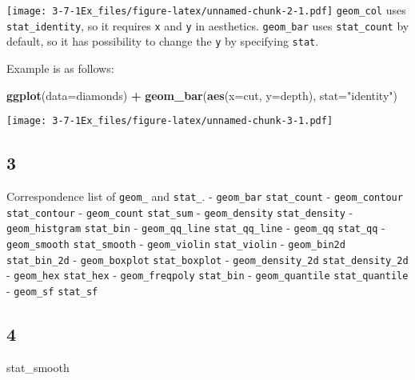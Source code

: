 \documentclass[]{article}
\newenvironment{Shaded}{\begin{snugshade}}{\end{snugshade}}
\newcommand{\DataTypeTok}[1]{\textcolor[rgb]{0.13,0.29,0.53}{#1}}
\newcommand{\KeywordTok}[1]{\textcolor[rgb]{0.13,0.29,0.53}{\textbf{#1}}}
\newcommand{\NormalTok}[1]{#1}
\newcommand{\OperatorTok}[1]{\textcolor[rgb]{0.81,0.36,0.00}{\textbf{#1}}}
\newcommand{\StringTok}[1]{\textcolor[rgb]{0.31,0.60,0.02}{#1}}
\begin{document}
\texttt{[image: 3-7-1Ex\_files/figure-latex/unnamed-chunk-2-1.pdf]}
\texttt{geom\_col} uses \texttt{stat\_identity}, so it requires
\texttt{x} and \texttt{y} in aesthetics. \texttt{geom\_bar} uses
\texttt{stat\_count} by default, so it has possibility to change the
\texttt{y} by specifying \texttt{stat}.

Example is as follows:

\begin{Shaded}
\begin{Highlighting}[]
\KeywordTok{ggplot}\NormalTok{(}\DataTypeTok{data=}\NormalTok{diamonds) }\OperatorTok{+}
\StringTok{    }\KeywordTok{geom_bar}\NormalTok{(}\KeywordTok{aes}\NormalTok{(}\DataTypeTok{x=}\NormalTok{cut, }\DataTypeTok{y=}\NormalTok{depth), }\DataTypeTok{stat=}\StringTok{"identity"}\NormalTok{)}
\end{Highlighting}
\end{Shaded}

\texttt{[image: 3-7-1Ex\_files/figure-latex/unnamed-chunk-3-1.pdf]}

\hypertarget{section-3}{%
\subsection{3}\label{section-3}}

Correspondence list of \texttt{geom\_} and \texttt{stat\_}. -
\texttt{geom\_bar} \texttt{stat\_count} - \texttt{geom\_contour}
\texttt{stat\_contour} - \texttt{geom\_count} \texttt{stat\_sum} -
\texttt{geom\_density} \texttt{stat\_density} - \texttt{geom\_histgram}
\texttt{stat\_bin} - \texttt{geom\_qq\_line} \texttt{stat\_qq\_line} -
\texttt{geom\_qq} \texttt{stat\_qq} - \texttt{geom\_smooth}
\texttt{stat\_smooth} - \texttt{geom\_violin} \texttt{stat\_violin} -
\texttt{geom\_bin2d} \texttt{stat\_bin\_2d} - \texttt{geom\_boxplot}
\texttt{stat\_boxplot} - \texttt{geom\_density\_2d}
\texttt{stat\_density\_2d} - \texttt{geom\_hex} \texttt{stat\_hex} -
\texttt{geom\_freqpoly} \texttt{stat\_bin} - \texttt{geom\_quantile}
\texttt{stat\_quantile} - \texttt{geom\_sf} \texttt{stat\_sf}

\hypertarget{section-4}{%
\subsection{4}\label{section-4}}

\begin{Shaded}
\begin{Highlighting}[]
\NormalTok{stat_smooth}
\end{Highlighting}
\end{Shaded}
\end{document}
